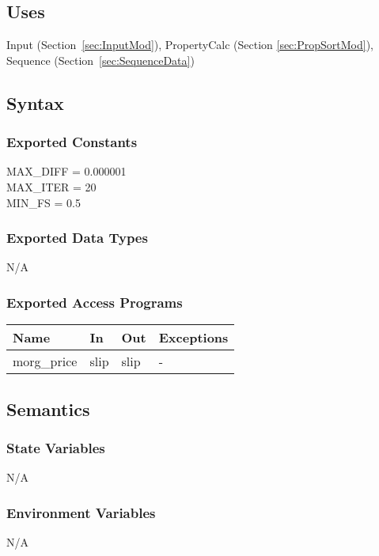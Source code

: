 \documentclass[12pt, titlepage]{article}
\begin{document}
\subsection{Uses}

Input (Section~\ref{sec:InputMod}), PropertyCalc (Section 
\ref{sec:PropSortMod}), Sequence (Section~\ref{sec:SequenceData})

\subsection{Syntax}

\subsubsection{Exported Constants}
MAX\_DIFF = 0.000001\\
MAX\_ITER = 20\\
MIN\_FS = 0.5\\

\subsubsection{Exported Data Types}
N/A

\subsubsection{Exported Access Programs}

\begin{center}
	\renewcommand*{\arraystretch}{1.5}
	\begin{tabular} {p{}  p{}  p{} 
			p{} } \hline 
		\textbf{Name} & \textbf{In} & \textbf{Out} & \textbf{Exceptions} \\ 
		\hline

  morg\_price & slip & slip & - \\ \hline
\end{tabular}
\end{center}

\subsection{Semantics}

\subsubsection{State Variables}
N/A

\subsubsection{Environment Variables}
N/A
\end{document}
